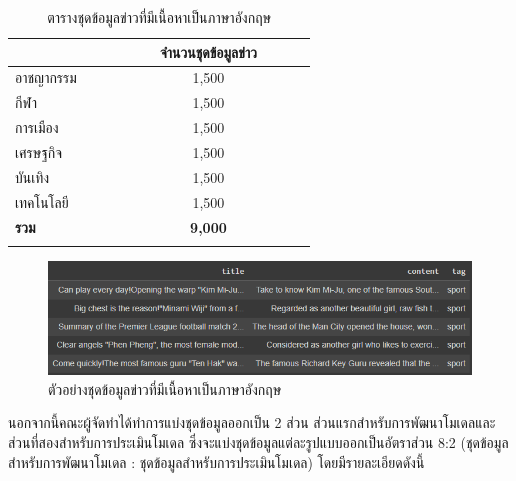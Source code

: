 \documentclass[12pt,oneside,openright,a4paper]{cpe-thai-project}
\begin{document}
      \begin{longtable}[!ht]{p{0.15\linewidth}m{0.45\linewidth}|}
        \caption{ตารางชุดข้อมูลข่าวที่มีเนื้อหาเป็นภาษาอังกฤษ}
        \label{tbl:new_eng}\\
        \hhline{==}
        \multicolumn{1}{c}{\textbf{หมวดหมู่}} & \multicolumn{1}{c}{\textbf{จำนวนชุดข้อมูลข่าว}} \\ \hline
        \endhead
        อาชญากรรม                              & \multicolumn{1}{c}{1,500}                        \\ %
        กีฬา                                   & \multicolumn{1}{c}{1,500}                         \\ %
        การเมือง                               & \multicolumn{1}{c}{1,500}                          \\ %
        เศรษฐกิจ                                 & \multicolumn{1}{c}{1,500}                          \\ %
        บันเทิง                                & \multicolumn{1}{c}{1,500}                          \\ %
        เทคโนโลยี                              & \multicolumn{1}{c}{1,500}                          \\ \hline
        \textbf{รวม}                           & \multicolumn{1}{c}{\textbf{9,000}}                        \\ \hhline{==}
      \end{longtable}
      \newpage

      \begin{figure}[!ht]\centering
        \includegraphics[width=13cm]{./img/news_eng.png}
        \caption{ตัวอย่างชุดข้อมูลข่าวที่มีเนื้อหาเป็นภาษาอังกฤษ}\label{fig:new_eng}
      \end{figure}

      \hspace{1cm}นอกจากนี้คณะผู้จัดทำได้ทำการแบ่งชุดข้อมูลออกเป็น 2 ส่วน ส่วนแรกสำหรับการพัฒนาโมเดลและส่วนที่สองสำหรับการประเมินโมเดล
      ซึ่งจะแบ่งชุดข้อมูลแต่ละรูปแบบออกเป็นอัตราส่วน 8:2 (ชุดข้อมูลสำหรับการพัฒนาโมเดล : ชุดข้อมูลสำหรับการประเมินโมเดล)
      โดยมีรายละเอียดดังนี้
\end{document}
